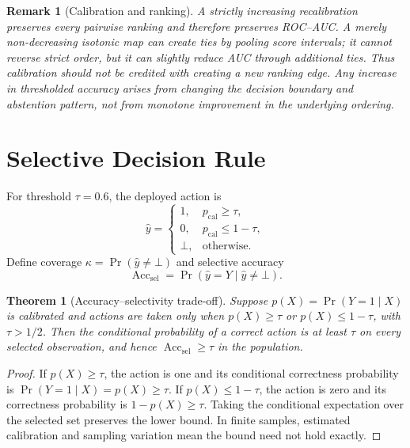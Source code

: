 \documentclass[11pt]{article}
\newtheorem{theorem}{Theorem}
\newtheorem{remark}{Remark}
\begin{document}
\begin{remark}[Calibration and ranking]
A strictly increasing recalibration preserves every pairwise ranking and therefore preserves ROC--AUC. A merely non-decreasing isotonic map can create ties by pooling score intervals; it cannot reverse strict order, but it can slightly reduce AUC through additional ties. Thus calibration should not be credited with creating a new ranking edge. Any increase in thresholded accuracy arises from changing the decision boundary and abstention pattern, not from monotone improvement in the underlying ordering.
\end{remark}

\section{Selective Decision Rule}
For threshold $\tau=0.6$, the deployed action is
\begin{equation}
 \widehat y=\begin{cases}1,&p_{\mathrm{cal}}\ge\tau,\\0,&p_{\mathrm{cal}}\le1-\tau,\\\bot,&\text{otherwise.}\end{cases}
\end{equation}
Define coverage $\kappa=\Pr(\widehat y\ne\bot)$ and selective accuracy
\begin{equation}
 \operatorname{Acc}_{\mathrm{sel}}=\Pr(\widehat y=Y\mid\widehat y\ne\bot).
\end{equation}

\begin{theorem}[Accuracy--selectivity trade-off]
Suppose $p(X)=\Pr(Y=1\mid X)$ is calibrated and actions are taken only when $p(X)\ge\tau$ or $p(X)\le1-\tau$, with $\tau>1/2$. Then the conditional probability of a correct action is at least $\tau$ on every selected observation, and hence $\operatorname{Acc}_{\mathrm{sel}}\ge\tau$ in the population.
\end{theorem}
\begin{proof}
If $p(X)\ge\tau$, the action is one and its conditional correctness probability is $\Pr(Y=1\mid X)=p(X)\ge\tau$. If $p(X)\le1-\tau$, the action is zero and its correctness probability is $1-p(X)\ge\tau$. Taking the conditional expectation over the selected set preserves the lower bound. In finite samples, estimated calibration and sampling variation mean the bound need not hold exactly.
\end{proof}
\end{document}
